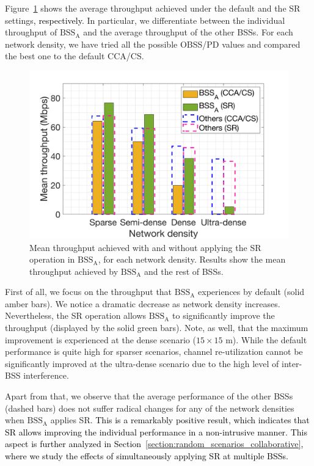 \documentclass[preprint,12pt]{elsarticle}
\theoremstyle{plain}
\begin{document}
Figure~\ref{fig:SIM_2_1} shows the average throughput achieved under the default and the SR settings\textcolor{black}{, respectively}. In particular, we differentiate between the individual throughput of $\text{BSS}_\text{A}$ and the average throughput of the other BSSs. For each network density, we have tried all the possible OBSS/PD values and compared the best one to the default CCA/CS.

\begin{figure}[ht!]
	\centering		
	\includegraphics[width=.48\columnwidth]{SIM_2_1}
	\caption{Mean throughput achieved with and without applying the SR operation in $\text{BSS}_\text{A}$, for each network density. Results show the mean throughput achieved by $\text{BSS}_\text{A}$ and the rest of BSSs.}
	\label{fig:SIM_2_1}
\end{figure}

First of all, we focus on the throughput that $\text{BSS}_\text{A}$ experiences by default (solid amber bars). We notice a dramatic decrease as network density increases. Nevertheless, the SR operation allows $\text{BSS}_\text{A}$ to significantly improve the throughput (displayed by the solid green bars). Note, as well, that the maximum improvement is experienced at the dense scenario ($15\times15$ m). While the default performance is quite high for sparser scenarios, channel re-utilization cannot be significantly improved at the ultra-dense scenario due to the high level of inter-BSS interference.

Apart from that, we observe that the average performance of the other BSSs (dashed bars) does not suffer radical changes for any of the network densities when $\text{BSS}_\text{A}$ applies SR. \textcolor{black}{This is a remarkably positive result, which indicates that SR allows improving the individual performance in a non-intrusive manner. This aspect is further analyzed in Section~\ref{section:random_scenarios_collaborative}, where we study the effects of simultaneously applying SR at multiple BSSs.}

\end{document}

